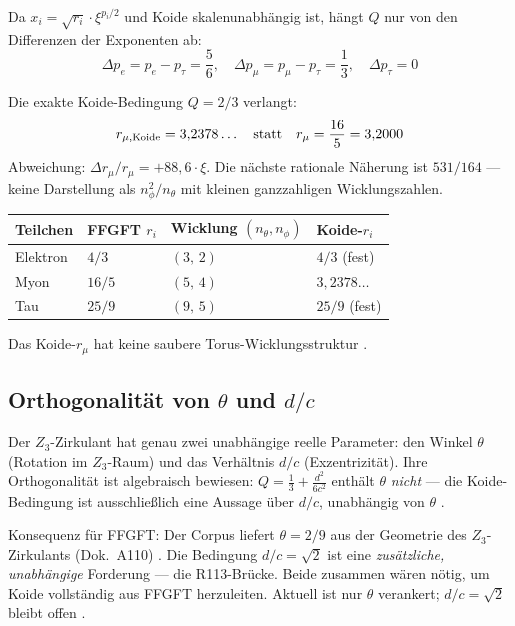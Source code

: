 Da $x_i = \sqrt{r_i}\cdot\xi^{p_i/2}$ und Koide skalenunabhängig ist, hängt $Q$ nur
von den Differenzen der Exponenten ab:
\begin{equation}
  \Delta p_e = p_e - p_\tau = \frac{5}{6},\quad
  \Delta p_\mu = p_\mu - p_\tau = \frac{1}{3},\quad
  \Delta p_\tau = 0
\end{equation}

Die exakte Koide-Bedingung $Q = 2/3$ verlangt:
\begin{equation}
  r_{\mu,{\rm Koide}} = 3{,}2378\ldots \quad\text{statt}\quad r_\mu = \frac{16}{5} = 3{,}2000
\end{equation}
Abweichung: $\Delta r_\mu / r_\mu = +88{,}6\cdot\xi$. Die nächste rationale Näherung
ist $531/164$ --- keine Darstellung als $n_\phi^2/n_\theta$ mit kleinen ganzzahligen
Wicklungszahlen.

\begin{center}
\begin{tabular}{@{}llll@{}}
\toprule
Teilchen & FFGFT $r_i$ & Wicklung $(n_\theta, n_\phi)$ & Koide-$r_i$ \\
\midrule
Elektron & $4/3$ & $(3,\,2)$ & $4/3$ (fest) \\
Myon & $16/5$ & $(5,\,4)$ & $3{,}2378\ldots$ \\
Tau & $25/9$ & $(9,\,5)$ & $25/9$ (fest) \\
\bottomrule
\end{tabular}
\end{center}

Das Koide-$r_\mu$ hat keine saubere Torus-Wicklungsstruktur \SM.

\subsection*{Orthogonalität von $\theta$ und $d/c$ \BM}

Der $Z_3$-Zirkulant hat genau zwei unabhängige reelle Parameter: den Winkel $\theta$
(Rotation im $Z_3$-Raum) und das Verhältnis $d/c$ (Exzentrizität). Ihre Orthogonalität
ist algebraisch bewiesen: $Q = \tfrac{1}{3} + \tfrac{d^2}{6c^2}$ enthält $\theta$
\emph{nicht} --- die Koide-Bedingung ist ausschließlich eine Aussage über $d/c$,
unabhängig von $\theta$ \BM.

Konsequenz für FFGFT: Der Corpus liefert $\theta = 2/9$ aus der Geometrie des
$Z_3$-Zirkulants (Dok.~A110) \KM. Die Bedingung $d/c = \sqrt{2}$ ist eine
\emph{zusätzliche, unabhängige} Forderung --- die R113-Brücke. Beide zusammen
wären nötig, um Koide vollständig aus FFGFT herzuleiten. Aktuell ist nur $\theta$
verankert; $d/c = \sqrt{2}$ bleibt offen \SM.

